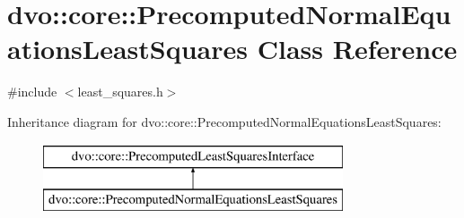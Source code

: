 \hypertarget{classdvo_1_1core_1_1_precomputed_normal_equations_least_squares}{}\section{dvo\+:\+:core\+:\+:Precomputed\+Normal\+Equations\+Least\+Squares Class Reference}
\label{classdvo_1_1core_1_1_precomputed_normal_equations_least_squares}


{\ttfamily \#include $<$least\+\_\+squares.\+h$>$}

Inheritance diagram for dvo\+:\+:core\+:\+:Precomputed\+Normal\+Equations\+Least\+Squares\+:\begin{figure}[H]
\begin{center}
\leavevmode
\includegraphics[height=2.000000cm]{classdvo_1_1core_1_1_precomputed_normal_equations_least_squares}
\end{center}
\end{figure}
